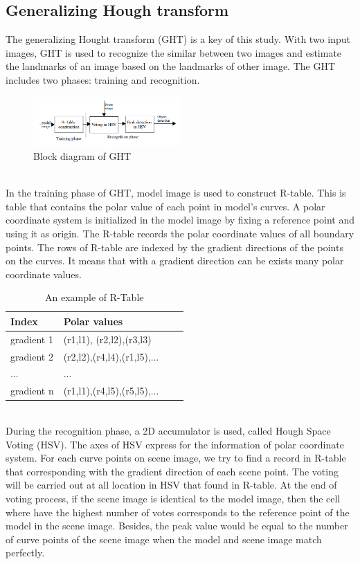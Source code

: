 \documentclass[twoside,twocolumn,10pt]{article}
\begin{document}
\subsection{Generalizing Hough transform}
The generalizing Hought transform (GHT)\cite{Ballard} is a key of this study. With two input images, GHT is used to recognize the similar between two images and estimate the landmarks of an image based on the landmarks of other image. The GHT includes two phases: training and recognition.\\[0.2cm]
\begin{figure}[htb]
    \centering
    \includegraphics[width=0.5\textwidth]{./images/ghtdiagram}
    \caption{Block diagram of GHT}
    \label{fig:box}
\end{figure}~\\
In the training phase of GHT, model image is used to construct R-table. This is table that contains the polar value of each point in model's curves. A polar coordinate system is initialized in the model image by fixing a reference point and using it as origin. The R-table records the polar coordinate values of all boundary points. The rows of R-table are indexed by the gradient directions of the points on the curves. It means that with a gradient direction can be exists many polar coordinate values.
\begin{table}[htb]
	\centering
	\begin{tabular}{|l|l|l|l|}
	\hline
	Index & Polar values \\
	\hline
	gradient 1 & (r1,l1), (r2,l2),(r3,l3) \\
	\hline
	gradient 2 & (r2,l2),(r4,l4),(r1,l5),... \\
	\hline
	... & ...\\
	\hline
	gradient n & (r1,l1),(r4,l5),(r5,l5),... \\
	\hline
	\end{tabular}
	\caption{An example of R-Table}
\end{table}\\
During the recognition phase, a 2D accumulator is used, called Hough Space Voting (HSV). The axes of HSV express for the information of polar coordinate system. For each curve points on scene image, we try to find a record in R-table that corresponding with the gradient direction of each scene point. The voting will be carried out at all location in HSV that found in R-table. At the end of voting process, if the scene image is identical to the model image, then the cell where have the highest number of votes corresponds to the reference point of the model in the scene image. Besides, the peak value would be equal to the number of curve points of the scene image when the model and scene image match perfectly.\\[0.2cm]
\end{document}
